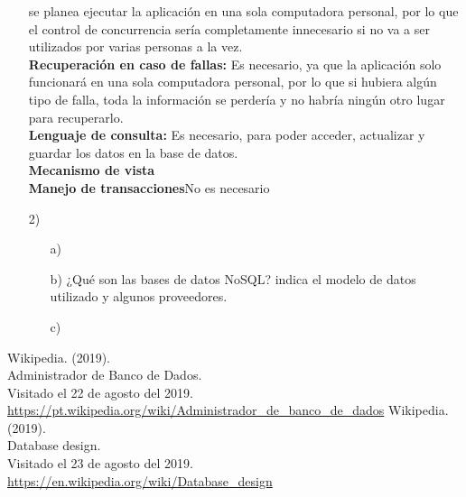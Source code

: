 \documentclass[a4paper, 12pt]{report}
\begin{document}
\begin{enumerate}
{\begin{enumerate}
{    se planea ejecutar la aplicación en una sola computadora
    personal, por lo que el control de concurrencia sería
    completamente innecesario si no va a ser utilizados por varias
    personas a la vez.\\
    \textbf{Recuperación en caso de fallas:} Es necesario, ya que
    la aplicación solo funcionará en una sola computadora personal,
    por lo que si hubiera algún tipo de falla, toda la información
    se perdería y no habría ningún otro lugar para recuperarlo.\\
    \textbf{Lenguaje de consulta:} Es necesario, para poder acceder,
    actualizar y guardar los datos en la base de datos.\\
    \textbf{Mecanismo de vista}\\
    \textbf{Manejo de transacciones}No es necesario\\}
\end{enumerate}
}
\item[2)]{
\begin{enumerate}
    \item[a)]{}
    \item[b)]{¿Qué son las bases de datos NoSQL? indica el modelo de datos utilizado y algunos proveedores. }%
    \item[c)]{}
\end{enumerate}
}
\end{enumerate}
\begin{thebibliography}{3}
        Wikipedia. (2019).\\
        Administrador de Banco de Dados.\\
        Visitado el 22 de agosto del 2019.\\
        \url{https://pt.wikipedia.org/wiki/Administrador_de_banco_de_dados}
        Wikipedia. (2019).\\
        Database design.\\
        Visitado el 23 de agosto del 2019.\\
        \url{https://en.wikipedia.org/wiki/Database_design}
\end{thebibliography}
\end{document}
